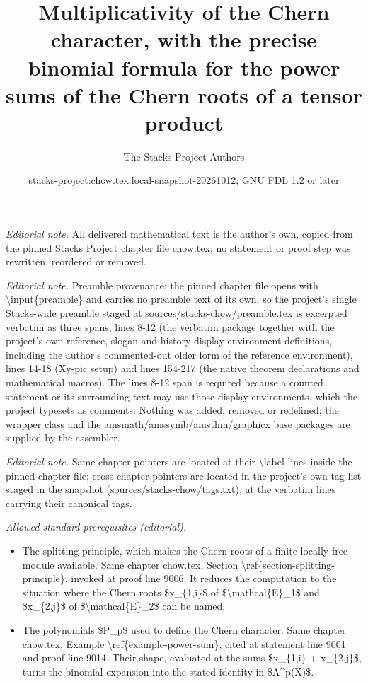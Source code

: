 \documentclass[10pt,a4paper]{amsart}
\title{Multiplicativity of the Chern character, with the precise binomial formula for the power sums of the Chern roots of a tensor product}
\author{The Stacks Project Authors}
\date{stacks-project:chow.tex:local-snapshot-20261012; GNU FDL 1.2 or later}
\theoremstyle{plain}
\theoremstyle{definition}
\theoremstyle{remark}
\numberwithin{equation}{subsection}
\begin{document}
\maketitle
\noindent\textit{Editorial note.} All delivered mathematical text is the author's own, copied from the pinned Stacks Project chapter file chow.tex; no statement or proof step was rewritten, reordered or removed.\par\medskip
\noindent\textit{Editorial note.} Preamble provenance: the pinned chapter file opens with \textbackslash{}input\{preamble\} and carries no preamble text of its own, so the project's single Stacks-wide preamble staged at sources/stacks-chow/preamble.tex is excerpted verbatim as three spans, lines 8-12 (the verbatim package together with the project's own reference, slogan and history display-environment definitions, including the author's commented-out older form of the reference environment), lines 14-18 (Xy-pic setup) and lines 154-217 (the native theorem declarations and mathematical macros). The lines 8-12 span is required because a counted statement or its surrounding text may use those display environments, which the project typesets as comments. Nothing was added, removed or redefined; the wrapper class and the amsmath/amssymb/amsthm/graphicx base packages are supplied by the assembler.\par\medskip
\noindent\textit{Editorial note.} Same-chapter pointers are located at their \textbackslash{}label lines inside the pinned chapter file; cross-chapter pointers are located in the project's own tag list staged in the snapshot (sources/stacks-chow/tags.txt), at the verbatim lines carrying their canonical tags.\par\medskip
\noindent\textit{Allowed standard prerequisites (editorial).}\begin{itemize}
\item The splitting principle, which makes the Chern roots of a finite locally free module available. Same chapter chow.tex, Section \textbackslash{}ref\{section-splitting-principle\}, invoked at proof line 9006. It reduces the computation to the situation where the Chern roots \$x\_\{1,i\}\$ of \$\textbackslash{}mathcal\{E\}\_1\$ and \$x\_\{2,j\}\$ of \$\textbackslash{}mathcal\{E\}\_2\$ can be named.
\item The polynomials \$P\_p\$ used to define the Chern character. Same chapter chow.tex, Example \textbackslash{}ref\{example-power-sum\}, cited at statement line 9001 and proof line 9014. Their shape, evaluated at the sums \$x\_\{1,i\} + x\_\{2,j\}\$, turns the binomial expansion into the stated identity in \$A\textasciicircum{}p(X)\$.
\end{itemize}\medskip
\end{document}
